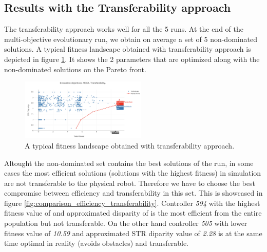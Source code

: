 \subsection{Results with the Transferability approach}

The transferability approach works well for all the 5 runs. At the end of the multi-objective evolutionary run, we obtain on average a set of 5 non-dominated solutions. A typical fitness landscape obtained with transferability approach is depicted in figure \ref{fig:best_pareto}. It shows the 2 parameters that are optimized along with the non-dominated solutions on the Pareto front.

\begin{figure}[H]
	\centering
  	\includegraphics[width=6cm]{include/images/pareto_best_moea.PNG}
  	\caption{A typical fitness landscape obtained with transferability approach.}
  	\label{fig:best_pareto}
\end{figure}

Altought the non-dominated set contains the best solutions of the run, in some cases the most efficient solutions (solutions with the highest fitness) in simulation are not transferable to the physical  robot. Therefore we have to choose the best compromise between efficiency and transferability in this set. This is showcased in figure \ref{fig:comparison_efficiency_transferability}. Controller \textit{594} with the highest fitness value of  and approximated disparity of  is the most efficient from the entire population but not transferable. On the other hand controller \textit{505} with lower fitness value of \textit{10.59} and approximated STR diparity value of \textit{2.28} is at the same time optimal in reality (avoids obstacles) and transferable.

